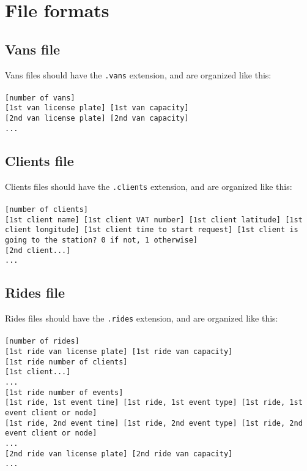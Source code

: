 \chapter{File formats} \label{appendix-fileformat}
\section{Vans file}
Vans files should have the \texttt{.vans} extension, and are organized like this:
\\
\\
\texttt{[number of vans]}\\
\texttt{[1st van license plate] [1st van capacity]}\\
\texttt{[2nd van license plate] [2nd van capacity]}\\
\texttt{...}


\section{Clients file}
Clients files should have the \texttt{.clients} extension, and are organized like this:
\\
\\
\texttt{[number of clients]}\\
\texttt{[1st client name] [1st client VAT number] [1st client latitude] [1st client longitude] [1st client time to start request] [1st client is going to the station? 0 if not, 1 otherwise]}\\
\texttt{[2nd client...]}\\
\texttt{...}


\section{Rides file}
Rides files should have the \texttt{.rides} extension, and are organized like this:
\\
\\
\texttt{[number of rides]}\\
\texttt{[1st ride van license plate] [1st ride van capacity]}\\
\texttt{[1st ride number of clients]}\\
\texttt{[1st client...]}\\
\texttt{...}\\
\texttt{[1st ride number of events]}\\
\texttt{[1st ride, 1st event time] [1st ride, 1st event type] [1st ride, 1st event client or node]}\\
\texttt{[1st ride, 2nd event time] [1st ride, 2nd event type] [1st ride, 2nd event client or node]}\\
\texttt{...}\\
\texttt{[2nd ride van license plate] [2nd ride van capacity]}\\
\texttt{...}

